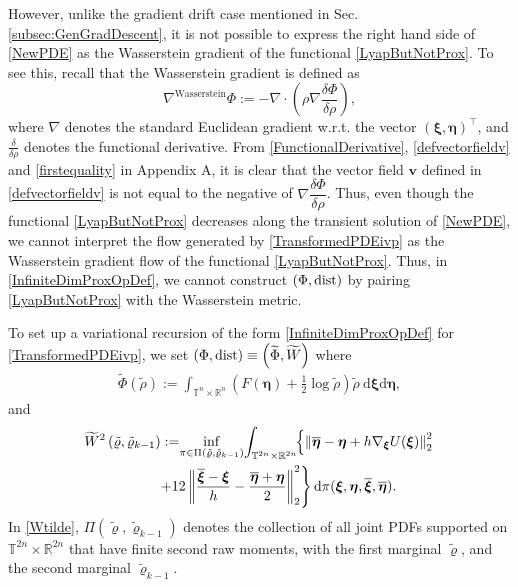 \documentclass[10pt,twocolumn]{IEEEtran}
\begin{document}
However, unlike the gradient drift case mentioned in Sec. \ref{subsec:GenGradDescent}, it is not possible to express the right hand side of \eqref{NewPDE} as the Wasserstein gradient of the functional \eqref{LyapButNotProx}. To see this, recall that the Wasserstein gradient is defined as \cite[Ch. 8]{ambrosio2008gradient} 
$$\nabla^{\text{Wasserstein}}\Phi := -\nabla\cdot\left(\rho\nabla\dfrac{\delta\Phi}{\delta\rho}\right),$$
where $\nabla$ denotes the standard Euclidean gradient w.r.t. the vector $(\bm{\xi},\bm{\eta})^{\top}$, and $\frac{\delta}{\delta\rho}$ denotes the functional derivative. From \eqref{FunctionalDerivative}, \eqref{defvectorfieldv} and \eqref{firstequality} in Appendix A, it is clear that the vector field $\bm{v}$ defined in \eqref{defvectorfieldv} is not equal to the negative of $\nabla\dfrac{\delta\Phi}{\delta\rho}$. Thus, even though the functional \eqref{LyapButNotProx} decreases along the transient solution of \eqref{NewPDE}, we cannot interpret the flow generated by \eqref{TransformedPDEivp} as the Wasserstein gradient flow of the functional \eqref{LyapButNotProx}. Thus, in \eqref{InfiniteDimProxOpDef}, we cannot construct $(\Phi,{\rm{dist}})$ by pairing \eqref{LyapButNotProx} with the Wasserstein metric.

To set up a variational recursion of the form \eqref{InfiniteDimProxOpDef} for \eqref{TransformedPDEivp}, we set $(\Phi,{\rm{dist}}) \equiv \left(\widetilde{\Phi},\widetilde{W}\right)$ where
\begin{align}
\widetilde{\Phi}(\tilde{\rho}) := \int_{\mathbb{T}^{n} \times \mathbb{R}^{n}}\left(F(\boldsymbol{\eta})+\frac{1}{2} \log \tilde{\rho}\right) \tilde{\rho}\: \mathrm{d} \boldsymbol{\xi} \mathrm{d} \boldsymbol{\eta},
\label{Phitilde}	
\end{align}
and 
\begin{align}
\widetilde{W}^{2}\left(\tilde{\varrho}, \tilde{\varrho}_{k-1}\right):=\!&\inf _{\pi \in \Pi\left(\tilde{\varrho}, \tilde{\varrho}_{k-1}\right)}\!\int_{\mathbb{T}^{2 n} \times \mathbb{R}^{2 n}}\!\!\left\{\left\|\overline{\boldsymbol{\eta}}-\boldsymbol{\eta}+h \nabla_{\boldsymbol{\xi}} U(\boldsymbol{\xi})\right\|_{2}^{2}\right.\nonumber\\
&\hspace*{-0.2in}\left.+12\left\|\frac{\overline{\boldsymbol{\xi}}-\boldsymbol{\xi}}{h}-\frac{\overline{\boldsymbol{\eta}}+\boldsymbol{\eta}}{2}\right\|_{2}^{2}\right\} \mathrm{d} \pi(\boldsymbol{\xi}, \boldsymbol{\eta}, \overline{\boldsymbol{\xi}}, \overline{\boldsymbol{\eta}}).
\label{Wtilde}	
\end{align}
In \eqref{Wtilde}, $\Pi\left(\tilde{\varrho}, \tilde{\varrho}_{k-1}\right)$ denotes the collection of all joint PDFs supported on $\mathbb{T}^{2 n} \times \mathbb{R}^{2 n}$ that have finite second raw moments, with the first marginal $\tilde{\varrho}$, and the second marginal $\tilde{\varrho}_{k-1}$.
\end{document}
